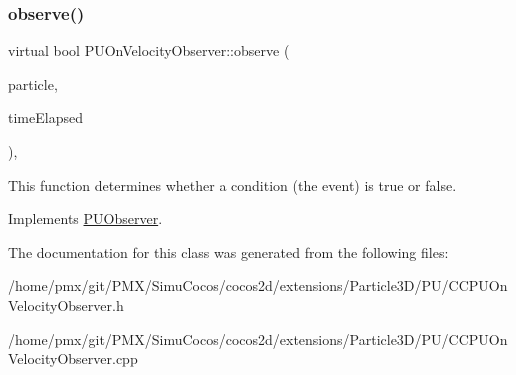 \mbox{\label{classPUOnVelocityObserver_aac0680a7af1e86d54dbf17edc20f83b9}} 
\subsubsection{\texorpdfstring{observe()}{observe()}\hspace{0.1cm}{\footnotesize\ttfamily [2/2]}}
{\footnotesize\ttfamily virtual bool P\+U\+On\+Velocity\+Observer\+::observe (\begin{DoxyParamCaption}\item[{\hyperlink{structPUParticle3D}{P\+U\+Particle3D} $\ast$}]{particle,  }\item[{float}]{time\+Elapsed }\end{DoxyParamCaption})\hspace{0.3cm}{\ttfamily [override]}, {\ttfamily [virtual]}}

This function determines whether a condition (the event) is true or false. 

Implements \hyperlink{classPUObserver_a50f59cc3245e291b641463db5d3037f7}{P\+U\+Observer}.



The documentation for this class was generated from the following files\+:\begin{DoxyCompactItemize}
\item 
/home/pmx/git/\+P\+M\+X/\+Simu\+Cocos/cocos2d/extensions/\+Particle3\+D/\+P\+U/C\+C\+P\+U\+On\+Velocity\+Observer.\+h\item 
/home/pmx/git/\+P\+M\+X/\+Simu\+Cocos/cocos2d/extensions/\+Particle3\+D/\+P\+U/C\+C\+P\+U\+On\+Velocity\+Observer.\+cpp\end{DoxyCompactItemize}
